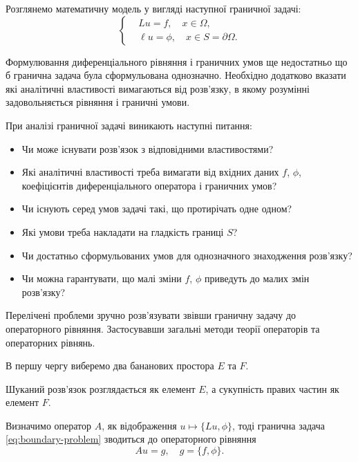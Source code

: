 Розглянемо математичну модель у вигляді наступної граничної задачі:
\begin{equation}
    \label{eq:boundary-problem}
    \left\{
        \begin{aligned}
            & L u = f, \quad x \in \Omega, \\
            & \ell u = \phi, \quad x \in S = \partial \Omega.
        \end{aligned}
    \right.
\end{equation}

Формулювання диференціального рівняння і граничних умов ще недостатньо що б гранична задача була сформульована однозначно. Необхідно додатково вказати які аналітичні властивості вимагаються від роз\-в'яз\-ку, в якому розумінні задовольняється рівняння і граничні умови. \medskip

При аналізі граничної задачі виникають наступні питання:
\begin{itemize}
    \item Чи може існувати розв'язок з відповідними властивостями?
    \item Які аналітичні властивості треба вимагати від вхідних даних $f$, $\phi$, коефіцієнтів диференціального оператора і граничних умов?
    \item Чи існують серед умов задачі такі, що протирічать одне одном?
    \item Які умови треба накладати на гладкість границі $S$?
    \item Чи достатньо сформульованих умов для однозначного знаходження розв’язку?
    \item Чи можна гарантувати, що малі зміни $f$, $\phi$ приведуть до малих змін розв'язку?
\end{itemize}

Перелічені проблеми зручно розв'язувати звівши граничну задачу до операторного рівняння. Застосувавши загальні методи теорії операторів та операторних рівнянь. \medskip

В першу чергу виберемо два бананових простора $E$ та $F$. \medskip

Шуканий розв'язок розглядається як елемент $E$, а сукупність правих частин як елемент $F$. \medskip

Визначимо оператор $A$, як відображення $u \mapsto \{Lu, \phi\}$, тоді гранична задача
\eqref{eq:boundary-problem} зводиться до операторного рівняння
\begin{equation}
    \label{eq:boundary-operator-equation}
    A u = g, \quad g = \{f, \phi\}.
\end{equation}

